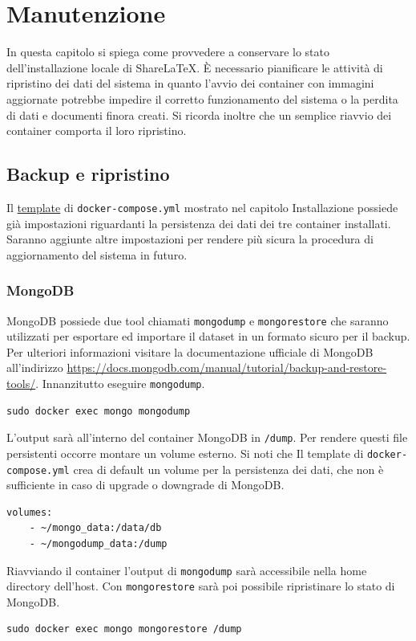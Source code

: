 \chapter{Manutenzione}
\label{Manutenzione}
\thispagestyle{empty}

In questa capitolo si spiega come provvedere a conservare lo stato dell'installazione locale di ShareLaTeX. È necessario pianificare le attività di ripristino dei dati del sistema in quanto l'avvio dei container con immagini aggiornate potrebbe impedire il corretto funzionamento del sistema o la perdita di dati e documenti finora creati. Si ricorda inoltre che un semplice riavvio dei container comporta il loro ripristino.

\section{Backup e ripristino}
Il \href{code:docker-compose.yml}{template} di \verb|docker-compose.yml| mostrato nel capitolo Installazione possiede già impostazioni riguardanti la persistenza dei dati dei tre container installati. Saranno aggiunte altre impostazioni per rendere più sicura la procedura di aggiornamento del sistema in futuro.

\subsection{MongoDB}
MongoDB possiede due tool chiamati \verb|mongodump| e \verb|mongorestore| che saranno utilizzati per esportare ed importare il dataset in un formato sicuro per il backup. Per ulteriori informazioni visitare la documentazione ufficiale di MongoDB all'indirizzo \url{https://docs.mongodb.com/manual/tutorial/backup-and-restore-tools/}. Innanzitutto eseguire \verb|mongodump|.
\begin{lstlisting}
sudo docker exec mongo mongodump
\end{lstlisting}
L'output sarà all'interno del container MongoDB in \verb|/dump|. Per rendere questi file persistenti occorre montare un volume esterno. Si noti che Il template di \verb|docker-compose.yml| crea di default un volume per la persistenza dei dati, che non è sufficiente in caso di upgrade o downgrade di MongoDB.
\begin{lstlisting}
volumes:
    - ~/mongo_data:/data/db
    - ~/mongodump_data:/dump
\end{lstlisting}
Riavviando il container l'output di \verb|mongodump| sarà accessibile nella home directory dell'host. Con \verb|mongorestore| sarà poi possibile ripristinare lo stato di MongoDB.
\begin{lstlisting}
sudo docker exec mongo mongorestore /dump
\end{lstlisting}

